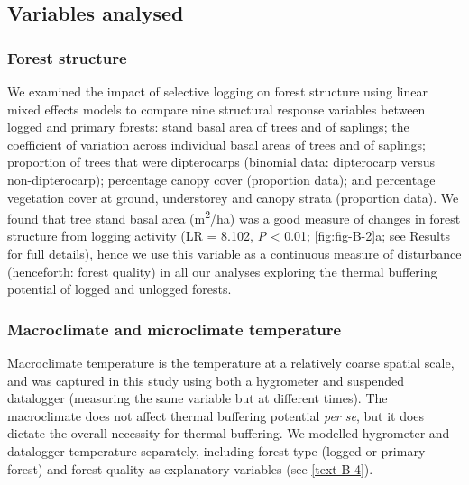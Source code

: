 \documentclass[12pt,a4paper,]{report}
\theoremstyle{definition}
\theoremstyle{definition}
\theoremstyle{definition}
\theoremstyle{remark}
\begin{document}
\subsection{Variables analysed}\label{variables-analysed}

\subsubsection*{Forest structure}\label{forest-structure-1}

We examined the impact of selective logging on forest structure using
linear mixed effects models to compare nine structural response
variables between logged and primary forests: stand basal area of trees
and of saplings; the coefficient of variation across individual basal
areas of trees and of saplings; proportion of trees that were
dipterocarps (binomial data: dipterocarp versus non-dipterocarp);
percentage canopy cover (proportion data); and percentage vegetation
cover at ground, understorey and canopy strata (proportion data). We
found that tree stand basal area (m\textsuperscript{2}/ha) was a good
measure of changes in forest structure from logging activity (LR =
8.102, \emph{P} \textless{} 0.01; \autoref{fig:fig-B-2}a; see Results
for full details), hence we use this variable as a continuous measure of
disturbance (henceforth: forest quality) in all our analyses exploring
the thermal buffering potential of logged and unlogged forests.

\subsubsection*{Macroclimate and microclimate
temperature}\label{macroclimate-and-microclimate-temperature}

Macroclimate temperature is the temperature at a relatively coarse
spatial scale, and was captured in this study using both a hygrometer
and suspended datalogger (measuring the same variable but at different
times). The macroclimate does not affect thermal buffering potential
\emph{per se}, but it does dictate the overall necessity for thermal
buffering. We modelled hygrometer and datalogger temperature separately,
including forest type (logged or primary forest) and forest quality as
explanatory variables (see \autoref{text-B-4}).
\end{document}
